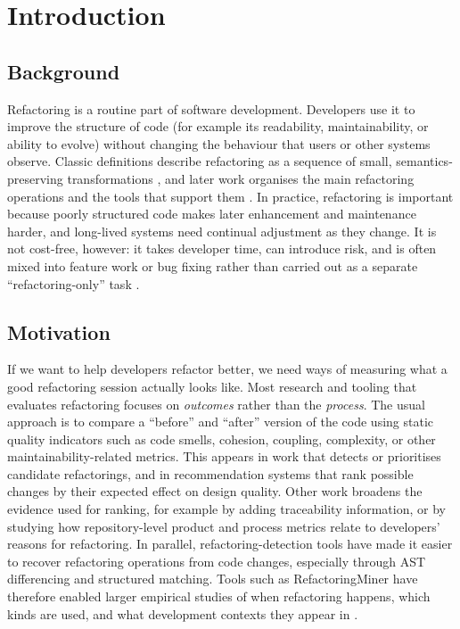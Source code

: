 \chapter{Introduction}
\section{Background}


Refactoring is a routine part of software development. Developers use it to improve the structure of code (for example its readability, maintainability, or ability to evolve) without changing the behaviour that users or other systems observe. Classic definitions describe refactoring as a sequence of small, semantics-preserving transformations \cite{opdyke1992refactoring,fowler1999refactoring,fowler2018refactoring}, and later work organises the main refactoring operations and the tools that support them \cite{mens2004survey}. In practice, refactoring is important because poorly structured code makes later enhancement and maintenance harder, and long-lived systems need continual adjustment as they change. It is not cost-free, however: it takes developer time, can introduce risk, and is often mixed into feature work or bug fixing rather than carried out as a separate ``refactoring-only'' task \cite{murphyhill2009howrefactor,kim2011apilevel}.

\section{Motivation}

If we want to help developers refactor better, we need ways of measuring what a good refactoring session actually looks like. Most research and tooling that evaluates refactoring focuses on \textit{outcomes} rather than the \textit{process}. The usual approach is to compare a ``before'' and ``after'' version of the code using static quality indicators such as code smells, cohesion, coupling, complexity, or other maintainability-related metrics. This appears in work that detects or prioritises candidate refactorings, and in recommendation systems that rank possible changes by their expected effect on design quality. Other work broadens the evidence used for ranking, for example by adding traceability information, or by studying how repository-level product and process metrics relate to developers' reasons for refactoring. In parallel, refactoring-detection tools have made it easier to recover refactoring operations from code changes, especially through AST differencing and structured matching. Tools such as RefactoringMiner have therefore enabled larger empirical studies of when refactoring happens, which kinds are used, and what development contexts they appear in \cite{alikhanifard2025rminer,falleri2024gumtree}.

